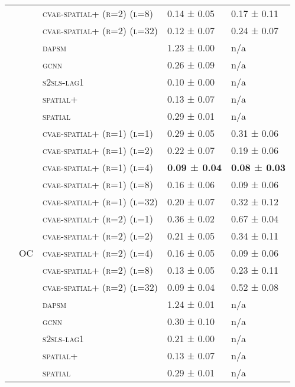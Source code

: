 \documentclass{article}
\begin{document}
\begin{table}[!tbp]
\begin{tabular}{lllll}
 &  & \textsc{cvae-\textsc{spatial+} (r=2) (l=8)} & 0.14 ± {\small 0.05} & 0.17 ± {\small 0.11} \\
 &  & \textsc{cvae-\textsc{spatial+} (r=2) (l=32)} & 0.12 ± {\small 0.07} & 0.24 ± {\small 0.07} \\
 &  & \textsc{dapsm} & 1.23 ± {\small 0.00} & n/a \\
 &  & \textsc{gcnn} & 0.26 ± {\small 0.09} & n/a \\
 &  & \textsc{s2sls-lag1} & 0.10 ± {\small 0.00} & n/a \\
 &  & \textsc{spatial+} & 0.13 ± {\small 0.07} & n/a \\
 &  & \textsc{spatial} & 0.29 ± {\small 0.01} & n/a \\
\cline{2-5}
 & \multirow[t]{15}{*}{OC} & \textsc{cvae-\textsc{spatial+} (r=1) (l=1)} & 0.29 ± {\small 0.05} & 0.31 ± {\small 0.06} \\
 &  & \textsc{cvae-\textsc{spatial+} (r=1) (l=2)} & 0.22 ± {\small 0.07} & 0.19 ± {\small 0.06} \\
 &  & \textsc{cvae-\textsc{spatial+} (r=1) (l=4)} & \bf 0.09 ± {\small 0.04} & \bf 0.08 ± {\small 0.03} \\
 &  & \textsc{cvae-\textsc{spatial+} (r=1) (l=8)} & 0.16 ± {\small 0.06} & 0.09 ± {\small 0.06} \\
 &  & \textsc{cvae-\textsc{spatial+} (r=1) (l=32)} & 0.20 ± {\small 0.07} & 0.32 ± {\small 0.12} \\
 &  & \textsc{cvae-\textsc{spatial+} (r=2) (l=1)} & 0.36 ± {\small 0.02} & 0.67 ± {\small 0.04} \\
 &  & \textsc{cvae-\textsc{spatial+} (r=2) (l=2)} & 0.21 ± {\small 0.05} & 0.34 ± {\small 0.11} \\
 &  & \textsc{cvae-\textsc{spatial+} (r=2) (l=4)} & 0.16 ± {\small 0.05} & 0.09 ± {\small 0.06} \\
 &  & \textsc{cvae-\textsc{spatial+} (r=2) (l=8)} & 0.13 ± {\small 0.05} & 0.23 ± {\small 0.11} \\
 &  & \textsc{cvae-\textsc{spatial+} (r=2) (l=32)} & 0.09 ± {\small 0.04} & 0.52 ± {\small 0.08} \\
 &  & \textsc{dapsm} & 1.24 ± {\small 0.01} & n/a \\
 &  & \textsc{gcnn} & 0.30 ± {\small 0.10} & n/a \\
 &  & \textsc{s2sls-lag1} & 0.21 ± {\small 0.00} & n/a \\
 &  & \textsc{spatial+} & 0.13 ± {\small 0.07} & n/a \\
 &  & \textsc{spatial} & 0.29 ± {\small 0.01} & n/a \\

\end{tabular}
\end{table}
\end{document}

